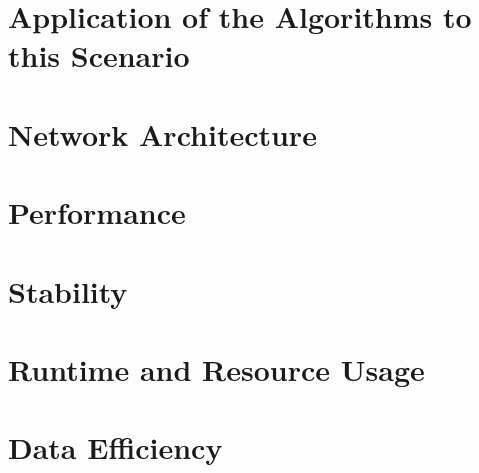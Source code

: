 \section{Application of the Algorithms to this Scenario}

\section{Network Architecture}

\section{Performance}

\section{Stability}

\section{Runtime and Resource Usage}

\section{Data Efficiency}
